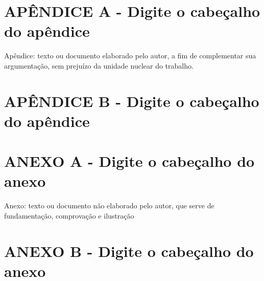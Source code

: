 \documentclass[
	12pt,				%
	openright,			%
	oneside,			%
	a4paper,			%
	brazil				%
	]{abntex2}
\begin{document}
\setlength{\afterchapskip}{\baselineskip}



\postextual


\begin{apendicesenv}

\partapendices

\chapter*{\normalsize APÊNDICE A - Digite o cabeçalho do apêndice}

Apêndice: texto ou documento elaborado pelo autor, a fim de complementar sua argumentação, sem prejuízo da
unidade nuclear do trabalho.

\chapter*{\normalsize APÊNDICE B - Digite o cabeçalho do apêndice}

\end{apendicesenv}

\begin{anexosenv}

\partanexos
\renewcommand{\ABNTEXchapterfontsize}{\ABNTEXsectionfont}

\chapter*{\normalsize ANEXO A - Digite o cabeçalho do anexo}

Anexo: texto ou documento não elaborado pelo autor, que serve de fundamentação, comprovação e ilustração

\chapter*{\normalsize ANEXO B - Digite o cabeçalho do anexo}

\end{anexosenv}
\end{document}
